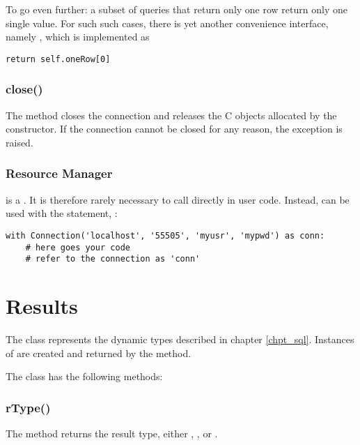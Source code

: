 \clearpage
To go even further: a subset of queries that return only
one row return only one single value. For such such cases,
there is yet another convenience interface, namely ,
which is implemented as

\begin{python}
\begin{lstlisting}
return self.oneRow[0]
\end{lstlisting}
\end{python}

\subsubsection{close()}
The method closes the connection and
releases the C objects allocated by
the constructor. If the connection
cannot be closed for any reason,
the exception  is raised.

\subsubsection{Resource Manager}
 is a .
It is therefore rarely necessary to call
 directly in user code.
Instead,  can
be used with the  statement, \ie:

\begin{python}
\begin{lstlisting}
with Connection('localhost', '55505', 'myusr', 'mypwd') as conn:
    # here goes your code
    # refer to the connection as 'conn'
\end{lstlisting}
\end{python}

\section{Results}
The  class represents
the dynamic types described in chapter \ref{chpt_sql}.
Instances of  are
created and returned by
the  method.

The  class has the following methods:

\subsubsection{rType()}
The method returns the result type,
either , ,
 or .

